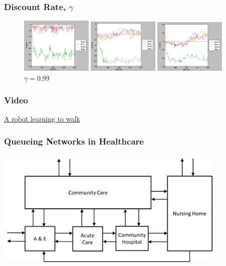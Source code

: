 \documentclass{beamer}
\begin{document}
\begin{frame}
	\frametitle{Discount Rate, $\gamma$}
\begin{figure}
	\begin{minipage}{.32\textwidth}
		\includegraphics[width=3.4cm]{Images/30a1g1}
			\caption{$\gamma = 0.1$}
	\end{minipage}
	\begin{minipage}{0.32\textwidth}
		\includegraphics[width=3.4cm]{Images/30a1g9}
			\caption{$\gamma = 0.9$}
	\end{minipage}
	\begin{minipage}{0.32\textwidth}
		\includegraphics[width=3.4cm]{Images/30a1g99}
			\caption{$\gamma = 0.99$}
	\end{minipage}
\end{figure}
\end{frame}

\begin{frame}
  \frametitle{Video}
  \href{https://www.youtube.com/watch?v=CthhCy-1Jeg}{A robot learning to walk}
\end{frame}

\begin{frame}
	\frametitle{Queueing Networks in Healthcare}
	\includegraphics[width=11cm]{Images/examplehealthsystem}
\end{frame}
\end{document}
